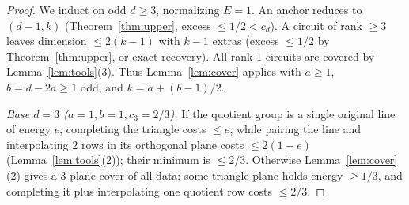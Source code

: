 \documentclass[11pt]{article}
\theoremstyle{plain}
\theoremstyle{definition}
\theoremstyle{remark}
\begin{document}
\begin{proof}
We induct on odd $d \ge 3$, normalizing $E = 1$.
An anchor reduces to $(d - 1, k)$ (Theorem~\ref{thm:upper}, excess $\le 1/2 < c_d$).
A circuit of rank $\ge 3$ leaves dimension $\le 2(k - 1)$ with $k - 1$ extras (excess $\le 1/2$ by Theorem~\ref{thm:upper}, or exact recovery).
All rank-$1$ circuits are covered by Lemma~\ref{lem:tools}(3).
Thus Lemma~\ref{lem:cover} applies with $a \ge 1$, $b = d - 2a \ge 1$ odd, and $k = a + (b - 1)/2$.

\emph{Base $d = 3$ ($a = 1, b = 1, c_3 = 2/3$).}
If the quotient group is a single original line of energy $e$, completing the triangle costs $\le e$, while pairing the line and interpolating $2$ rows in its orthogonal plane costs $\le 2(1 - e)$ (Lemma~\ref{lem:tools}(2)); their minimum is $\le 2/3$.
Otherwise Lemma~\ref{lem:cover}(2) gives a $3$-plane cover of all data; some triangle plane holds energy $\ge 1/3$, and completing it plus interpolating one quotient row costs $\le 2/3$.


\end{proof}
\end{document}
